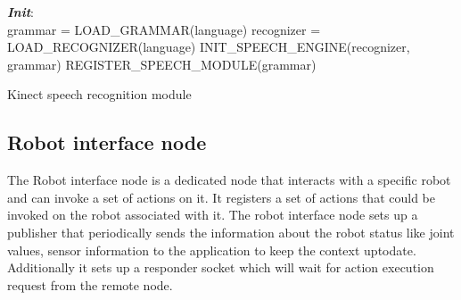 \begin{algorithm}[H]
 \textbf{\emph{Init}}:\\
 \quad grammar = LOAD\_GRAMMAR(language)\;
 \quad recognizer = LOAD\_RECOGNIZER(language)\;
 \quad INIT\_SPEECH\_ENGINE(recognizer, grammar)\;
 \quad REGISTER\_SPEECH\_MODULE(grammar)\;
 \caption{Kinect speech recognition module}
 \label{alg:speech_recognize}
\end{algorithm}

\subsection{Robot interface node} 
The Robot interface node is a dedicated node that interacts with a specific robot and can invoke a set of actions on it.  It registers a set of actions that could be invoked on the robot associated with it. The robot interface node sets up a publisher that periodically sends the information about the robot status like joint values, sensor information to the application to keep the context uptodate. Additionally it sets up a responder socket which will wait for action execution request from the remote node. 

